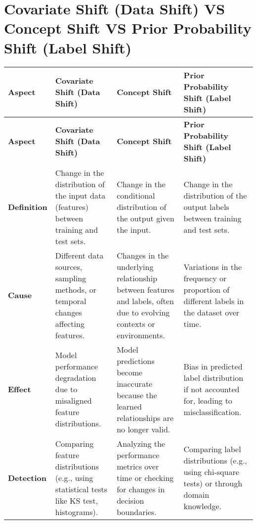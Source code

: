 
\section{Covariate Shift (Data Shift) VS Concept Shift VS Prior Probability Shift (Label Shift) \cite{chatgpt}} \label{Covariate Shift (Data Shift) VS Concept Shift VS Prior Probability Shift (Label Shift)}

\begin{longtable}{|m{2cm}|m{4.5cm}|m{4.5cm}|m{4.5cm}|}
    \hline
    
    \textbf{Aspect} & \textbf{Covariate Shift (Data Shift)} & \textbf{Concept Shift} & \textbf{Prior Probability Shift (Label Shift)} \\ \hline
    \endfirsthead
    
    \textbf{Aspect} & \textbf{Covariate Shift (Data Shift)} & \textbf{Concept Shift} & \textbf{Prior Probability Shift (Label Shift)} \\ \hline
    \endhead
    
    \hline\endfoot
    
    \hline\endlastfoot
    
    \textbf{Definition} & Change in the distribution of the input data (features) between training and test sets. & Change in the conditional distribution of the output given the input. & Change in the distribution of the output labels between training and test sets. \\ \hline
    
    \textbf{Cause} & Different data sources, sampling methods, or temporal changes affecting features. & Changes in the underlying relationship between features and labels, often due to evolving contexts or environments. & Variations in the frequency or proportion of different labels in the dataset over time. \\ \hline

    \textbf{Effect} & Model performance degradation due to misaligned feature distributions. & Model predictions become inaccurate because the learned relationships are no longer valid. & Bias in predicted label distribution if not accounted for, leading to misclassification. \\ \hline

    \textbf{Detection} & Comparing feature distributions (e.g., using statistical tests like KS test, histograms). & Analyzing the performance metrics over time or checking for changes in decision boundaries. & Comparing label distributions (e.g., using chi-square tests) or through domain knowledge. \\ \hline


\end{longtable}
